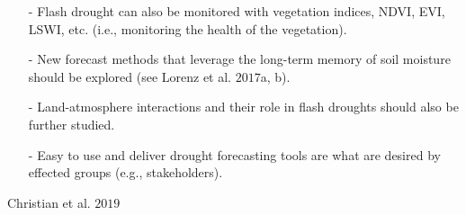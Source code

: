 \documentclass[12pt, letterpaper]{article}
\begin{document}
\begin{itemize}
        \item[-] Flash drought can also be monitored with vegetation indices, NDVI, EVI, LSWI, etc. 
                 (i.e., monitoring the health of the vegetation).
        \item[-] New forecast methods that leverage the long-term memory of soil moisture should be
                 explored (see Lorenz et al. $2017$a, b).
        \item[-] Land-atmosphere interactions and their role in flash droughts should also be further
                 studied.
        \item[-] Easy to use and deliver drought forecasting tools are what are desired by effected 
                 groups (e.g., stakeholders).
	\end{itemize}
    \par \par
    Christian et al. $2019$
\end{document}
